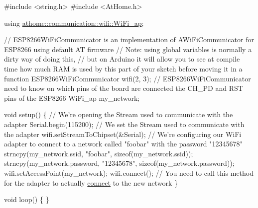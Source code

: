 \begin{DoxyCode}
\textcolor{preprocessor}{#include <string.h>}
\textcolor{preprocessor}{#include <AtHome.h>}

\textcolor{keyword}{using} \mbox{\hyperlink{structathome_1_1communication_1_1wifi_1_1s__wifi__access__point}{athome::communication::wifi::WiFi\_ap}};

\textcolor{comment}{// ESP8266WiFiCommunicator is an implementation of AWiFiCommunicator for}
ESP8266 \textcolor{keyword}{using} \textcolor{keywordflow}{default} AT firmware
\textcolor{comment}{// Note: using global variables is normally a dirty way of doing this,}
\textcolor{comment}{// but on Arduino it will allow you to see at compile time how much RAM is}
used by \textcolor{keyword}{this} part of your sketch before moving it in a \textcolor{keyword}{function}
ESP8266WiFiCommunicator wifi(2, 3); \textcolor{comment}{// ESP8266WiFiCommunicator need to know}
on which pins of the board are connected the CH\_PD and RST pins of the
ESP8266 WiFi\_ap my\_network;

\textcolor{keywordtype}{void} setup() \{
  \textcolor{comment}{// We're opening the Stream used to communicate with the adapter}
  Serial.begin(115200);
  \textcolor{comment}{// We set the Stream used to communicate with the adapter}
  wifi.setStreamToChipset(&Serial);
  \textcolor{comment}{// We're configuring our WiFi adapter to connect to a network called}
\textcolor{stringliteral}{"foobar"} with the password \textcolor{stringliteral}{"12345678"} strncpy(my\_network.ssid, \textcolor{stringliteral}{"foobar"},
\textcolor{keyword}{sizeof}(my\_network.ssid)); strncpy(my\_network.password, \textcolor{stringliteral}{"12345678"},
\textcolor{keyword}{sizeof}(my\_network.password)); wifi.setAccessPoint(my\_network);
  wifi.connect(); \textcolor{comment}{// You need to call this method for the adapter to}
actually \mbox{\hyperlink{classathome_1_1communication_1_1wifi_1_1_a_wi_fi_communicator_a309927109fbc19aa0fb2afb71d50bbf9}{connect}} to the \textcolor{keyword}{new} network
\}

\textcolor{keywordtype}{void} loop() \{
\}
\end{DoxyCode}
 \mbox{\label{classathome_1_1communication_1_1wifi_1_1_a_wi_fi_communicator_a31fb91672f298718d99bb9776dfe46c9}} 
